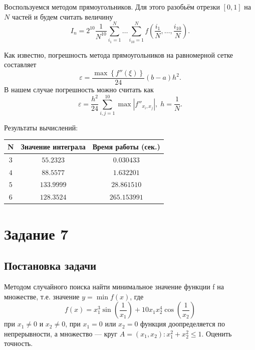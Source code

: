 \documentclass[11pt]{article}
\newcommand\abs[1]{\left\lvert#1\right\rvert}
\begin{document}
Воспользуемся методом прямоугольников. Для этого разобьём отрезки $[0, 1]$ на $N$ частей и будем считать величину
$$
I_n = 2^{10} \frac{1}{N^{10}} \sum\limits_{i_1 = 1}^N \ldots \sum\limits_{i_{10} = 1}^N f\left( \frac{i_1}{N}, \ldots, \frac{i_{10}}{N} \right).
$$

Как известно, погрешность метода прямоугольников на равномерной сетке составляет
$$
\varepsilon = \frac{\max\left\{ f''(\xi) \right\}}{24} (b - a) h^2.
$$
В нашем случае погрешность можно считать как
$$
\varepsilon = \frac{h^2}{24} \sum\limits_{i,j = 1}^{10} \max \abs{f''_{x_i, x_j}}, \; h = \frac{1}{N}.
$$

Результаты вычислений:

\begin{tabular}{|c|c|c|}
	\hline
	N & Значение интеграла & Время работы (сек.) \\
	\hline
	$3$ & $55.2323$ & $0.030433$ \\
	\hline
	$4$ & $88.5577$ & $1.632201$ \\
	\hline
	$5$ & $133.9999$ & $28.861510$ \\
	\hline
	$6$ & $128.3524$ & $265.153991$ \\
	\hline
\end{tabular}
\pagebreak
\section{Задание 7}
\subsection{Постановка задачи}
Методом случайного поиска найти минимальное значение функции f на множестве, т.е. значение $y = \min f(x)$, где
$$
f(x) = x_1^3 \sin \left( \frac{1}{x_1} \right) + 10 x_1 x_2^4 \cos \left( \frac{1}{x_2} \right)
$$
при $x_1 \neq 0$ и $x_2 \neq 0$, при $x_1 = 0$ или $x_2 = 0$ функция доопределяется по непрерывности, а множество --- круг $A = (x_1, x_2): x_1^2 + x_2^2 \leqslant 1$. Оценить точность.
\end{document}
